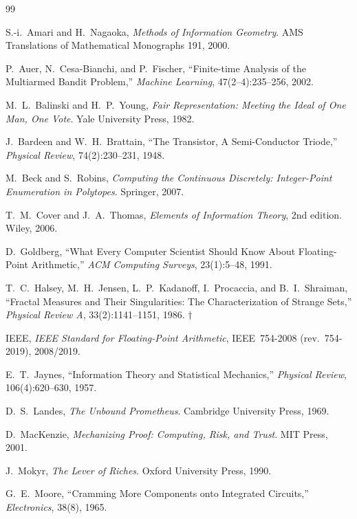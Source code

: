 \documentclass[12pt,oneside]{report}
\theoremstyle{plain}
\theoremstyle{definition}
\theoremstyle{remark}
\newcommand{\daggerfootnote}{$\dagger$\ }
\begin{document}
\begin{thebibliography}{99}
\small

S.-i.~Amari and H.~Nagaoka, \emph{Methods of Information Geometry}.
AMS Translations of Mathematical Monographs 191, 2000.

P.~Auer, N.~Cesa-Bianchi, and P.~Fischer, ``Finite-time Analysis of
the Multiarmed Bandit Problem,'' \emph{Machine Learning},
47(2--4):235--256, 2002.

M.~L.~Balinski and H.~P.~Young, \emph{Fair Representation: Meeting the
Ideal of One Man, One Vote}. Yale University Press, 1982.

J.~Bardeen and W.~H.~Brattain, ``The Transistor, A Semi-Conductor
Triode,'' \emph{Physical Review}, 74(2):230--231, 1948.

M.~Beck and S.~Robins, \emph{Computing the Continuous Discretely:
Integer-Point Enumeration in Polytopes}. Springer, 2007.

T.~M.~Cover and J.~A.~Thomas, \emph{Elements of Information Theory},
2nd edition. Wiley, 2006.

D.~Goldberg, ``What Every Computer Scientist Should Know About
Floating-Point Arithmetic,'' \emph{ACM Computing Surveys},
23(1):5--48, 1991.

T.~C.~Halsey, M.~H.~Jensen, L.~P.~Kadanoff, I.~Procaccia, and
B.~I.~Shraiman, ``Fractal Measures and Their Singularities: The
Characterization of Strange Sets,'' \emph{Physical Review A},
33(2):1141--1151, 1986. \daggerfootnote

IEEE, \emph{IEEE Standard for Floating-Point Arithmetic},
IEEE~754-2008 (rev.\ 754-2019), 2008/2019.

E.~T.~Jaynes, ``Information Theory and Statistical Mechanics,''
\emph{Physical Review}, 106(4):620--630, 1957.

D.~S.~Landes, \emph{The Unbound Prometheus}. Cambridge University
Press, 1969.

D.~MacKenzie, \emph{Mechanizing Proof: Computing, Risk, and Trust}.
MIT Press, 2001.

J.~Mokyr, \emph{The Lever of Riches}. Oxford University Press, 1990.

G.~E.~Moore, ``Cramming More Components onto Integrated Circuits,''
\emph{Electronics}, 38(8), 1965.


\end{thebibliography}
\end{document}
